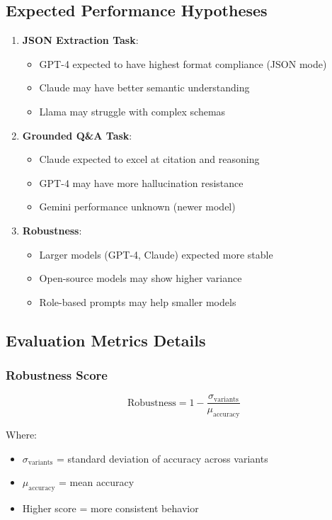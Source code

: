 \documentclass[11pt,a4paper]{article}
\begin{document}
\subsection{Expected Performance Hypotheses}

\begin{enumerate}[leftmargin=*]
    \item \textbf{JSON Extraction Task}:
    \begin{itemize}
        \item GPT-4 expected to have highest format compliance (JSON mode)
        \item Claude may have better semantic understanding
        \item Llama may struggle with complex schemas
    \end{itemize}
    
    \item \textbf{Grounded Q\&A Task}:
    \begin{itemize}
        \item Claude expected to excel at citation and reasoning
        \item GPT-4 may have more hallucination resistance
        \item Gemini performance unknown (newer model)
    \end{itemize}
    
    \item \textbf{Robustness}:
    \begin{itemize}
        \item Larger models (GPT-4, Claude) expected more stable
        \item Open-source models may show higher variance
        \item Role-based prompts may help smaller models
    \end{itemize}
\end{enumerate}

\subsection{Evaluation Metrics Details}

\subsubsection{Robustness Score}

\[
\text{Robustness} = 1 - \frac{\sigma_{\text{variants}}}{\mu_{\text{accuracy}}}
\]

Where:
\begin{itemize}
    \item $\sigma_{\text{variants}}$ = standard deviation of accuracy across variants
    \item $\mu_{\text{accuracy}}$ = mean accuracy
    \item Higher score = more consistent behavior
\end{itemize}
\end{document}

